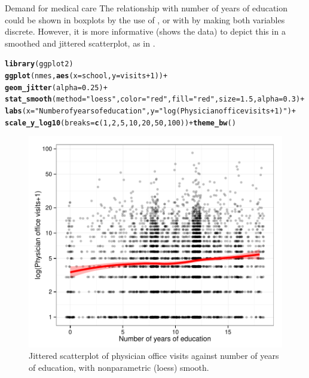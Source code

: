 \documentclass[11pt]{book}\usepackage[]{graphicx}\usepackage[]{color}
\makeatletter
\newcommand{\hlnum}[1]{\textcolor[rgb]{0.686,0.059,0.569}{#1}}%
\newcommand{\hlstr}[1]{\textcolor[rgb]{0.192,0.494,0.8}{#1}}%
\newcommand{\hlopt}[1]{\textcolor[rgb]{0,0,0}{#1}}%
\newcommand{\hlstd}[1]{\textcolor[rgb]{0.345,0.345,0.345}{#1}}%
\newcommand{\hlkwc}[1]{\textcolor[rgb]{0.333,0.667,0.333}{#1}}%
\newcommand{\hlkwd}[1]{\textcolor[rgb]{0.737,0.353,0.396}{\textbf{#1}}}%
\newenvironment{kframe}{%
 \def\at@end@of@kframe{}%
 \ifinner\ifhmode%
  \def\at@end@of@kframe{\end{minipage}}%
  \begin{minipage}{\columnwidth}%
 \fi\fi%
 \def\FrameCommand##1{\hskip\@totalleftmargin \hskip-\fboxsep
 \colorbox{shadecolor}{##1}\hskip-\fboxsep
     \hskip-\linewidth \hskip-\@totalleftmargin \hskip\columnwidth}%
 \MakeFramed {\advance\hsize-\width
   \@totalleftmargin\z@ \linewidth\hsize
   \@setminipage}}%
 {\par\unskip\endMakeFramed%
 \at@end@of@kframe}
\newenvironment{knitrout}{}{} %
\renewenvironment{knitrout}{\small\renewcommand{\baselinestretch}{.85}}{} %
\makeatother
\begin{document}
\begin{Example}[nmes1]{Demand for medical care}
The relationship with number of years of education could be shown in boxplots by the use of
, or with  by making both variables discrete.
However, it is more informative (shows the data)
to depict this in a smoothed and jittered scatterplot,
as in .
\begin{knitrout}
\color{fgcolor}\begin{kframe}
\begin{alltt}
\hlkwd{library}\hlstd{(ggplot2)}
\hlkwd{ggplot}\hlstd{(nmes,} \hlkwd{aes}\hlstd{(}\hlkwc{x}\hlstd{=school,} \hlkwc{y}\hlstd{=visits}\hlopt{+}\hlnum{1}\hlstd{))} \hlopt{+}
  \hlkwd{geom_jitter}\hlstd{(}\hlkwc{alpha}\hlstd{=}\hlnum{0.25}\hlstd{)} \hlopt{+}
  \hlkwd{stat_smooth}\hlstd{(}\hlkwc{method}\hlstd{=}\hlstr{"loess"}\hlstd{,} \hlkwc{color}\hlstd{=}\hlstr{"red"}\hlstd{,} \hlkwc{fill}\hlstd{=}\hlstr{"red"}\hlstd{,} \hlkwc{size}\hlstd{=}\hlnum{1.5}\hlstd{,} \hlkwc{alpha}\hlstd{=}\hlnum{0.3}\hlstd{)} \hlopt{+}
  \hlkwd{labs}\hlstd{(}\hlkwc{x}\hlstd{=}\hlstr{"Number of years of education"}\hlstd{,} \hlkwc{y}\hlstd{=}\hlstr{"log(Physician office visits+1)"}\hlstd{)} \hlopt{+}
  \hlkwd{scale_y_log10}\hlstd{(}\hlkwc{breaks}\hlstd{=}\hlkwd{c}\hlstd{(}\hlnum{1}\hlstd{,}\hlnum{2}\hlstd{,}\hlnum{5}\hlstd{,}\hlnum{10}\hlstd{,}\hlnum{20}\hlstd{,}\hlnum{50}\hlstd{,}\hlnum{100}\hlstd{))} \hlopt{+} \hlkwd{theme_bw}\hlstd{()}
\end{alltt}
\end{kframe}\begin{figure}[!htbp]


\centerline{\includegraphics[width=.6\textwidth]{ch09/fig/nmes-school-1} }

\caption[Jittered scatterplot of physician office visits against number of years of education, with nonparametric (loess) smooth]{Jittered scatterplot of physician office visits against number of years of education, with nonparametric (loess) smooth.\label{fig:nmes-school}}
\end{figure}



\end{knitrout}
\end{Example}
\end{document}
